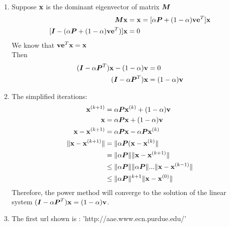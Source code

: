 \documentclass{article}
\begin{document}
\begin{enumerate}
\item 
Suppose $\vx$ is the dominant eigenvector of matrix $\mM$  \\
\begin{align*} 
\mM\vx &= \vx  = [\alpha\mP+(1-\alpha)\vv\ve^T]\vx \\ 
[\mI-(\alpha\mP+(1-\alpha)\vv\ve^T)]\vx &=0 \\
\end{align*} 
We know that $\vv\ve^T\vx = \vx$ \\ 
Then \\
\begin{align*} 
(\mI-\alpha\mP^T)\vx-(1-\alpha)\vv & = 0 \\
 (\mI-\alpha\mP^T)\vx &= (1-\alpha)\vv
\end{align*}
\item 
The simplified iterations: \\
\begin{align*} 
\vx^{(k+1)} &= \alpha\mP\vx^{(k)} + (1-\alpha)\vv  \\
\vx  &= \alpha \mP\vx + (1-\alpha)\vv \\ 
\vx-\vx^{(k+1)} & = \alpha\mP\vx-\alpha\mP\vx^{(k)} \\
\|\vx-\vx^{(k+1)}\| &=\|\alpha\mP(\vx-\vx^{(k)}\|  \\
& = \|\alpha\mP\|\|\vx-\vx^{(k+1)} \|  \\
& \leq  \|\alpha\mP\| \|\alpha\mP\|...\|\vx-\vx^{(k-1)} \| \\
& \leq  \|\alpha\mP\|^{k+1}\|\vx-\vx^{(0)}\| \\
\end{align*} 
Therefore, the power method will converge to the solution of the linear system $ (\mI-\alpha\mP^T)\vx = (1-\alpha)\vv$. 

\item 
The first url shown is : 'http://aae.www.ecn.purdue.edu/' \\


\end{enumerate}
\end{document}

